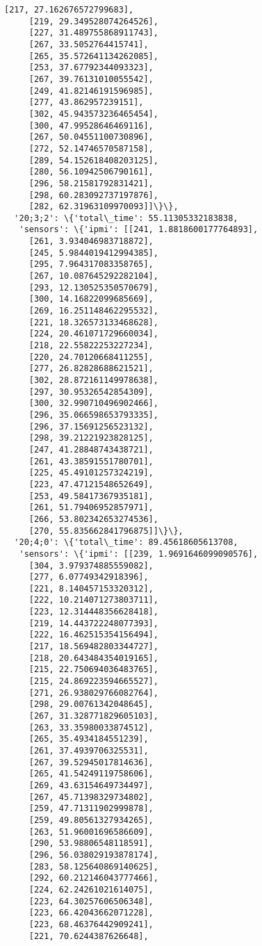 \documentclass[11pt]{article}
\begin{document}
\begin{tcolorbox}[breakable, size=fbox, boxrule=.5pt, pad at break*=1mm, opacityfill=0]
\begin{Verbatim}[commandchars=\\\{\}]
     [217, 27.162676572799683],
     [219, 29.349528074264526],
     [227, 31.489755868911743],
     [267, 33.5052764415741],
     [265, 35.572641134262085],
     [253, 37.67792344093323],
     [267, 39.76131010055542],
     [249, 41.82146191596985],
     [277, 43.862957239151],
     [302, 45.943573236465454],
     [300, 47.99528646469116],
     [267, 50.04551100730896],
     [272, 52.14746570587158],
     [289, 54.152618408203125],
     [280, 56.10942506790161],
     [296, 58.21581792831421],
     [298, 60.283092737197876],
     [282, 62.31963109970093]]\}\},
  '20;3;2': \{'total\_time': 55.11305332183838,
   'sensors': \{'ipmi': [[241, 1.8818600177764893],
     [261, 3.934046983718872],
     [245, 5.9844019412994385],
     [295, 7.964317083358765],
     [267, 10.087645292282104],
     [293, 12.130525350570679],
     [300, 14.16822099685669],
     [269, 16.251148462295532],
     [221, 18.326573133468628],
     [224, 20.461071729660034],
     [218, 22.55822253227234],
     [220, 24.70120668411255],
     [277, 26.82828688621521],
     [302, 28.872161149978638],
     [297, 30.95326542854309],
     [300, 32.990710496902466],
     [296, 35.066598653793335],
     [296, 37.15691256523132],
     [298, 39.21221923828125],
     [247, 41.28848743438721],
     [261, 43.38591551780701],
     [225, 45.49101257324219],
     [223, 47.47121548652649],
     [253, 49.58417367935181],
     [261, 51.79406952857971],
     [266, 53.802342653274536],
     [270, 55.835662841796875]]\}\},
  '20;4;0': \{'total\_time': 89.45618605613708,
   'sensors': \{'ipmi': [[239, 1.9691646099090576],
     [304, 3.979374885559082],
     [277, 6.07749342918396],
     [221, 8.140457153320312],
     [222, 10.214071273803711],
     [223, 12.314448356628418],
     [219, 14.443722248077393],
     [222, 16.462515354156494],
     [217, 18.569482803344727],
     [218, 20.643484354019165],
     [215, 22.750694036483765],
     [215, 24.869223594665527],
     [271, 26.938029766082764],
     [298, 29.00761342048645],
     [267, 31.328771829605103],
     [263, 33.35980033874512],
     [265, 35.4934184551239],
     [261, 37.4939706325531],
     [267, 39.52945017814636],
     [265, 41.54249119758606],
     [269, 43.63154649734497],
     [267, 45.71398329734802],
     [259, 47.71311902999878],
     [259, 49.80561327934265],
     [263, 51.96001696586609],
     [290, 53.98806548118591],
     [296, 56.038029193878174],
     [283, 58.125640869140625],
     [292, 60.212146043777466],
     [224, 62.24261021614075],
     [223, 64.30257606506348],
     [223, 66.42043662071228],
     [223, 68.46376442909241],
     [221, 70.6244387626648],

\end{Verbatim}
\end{tcolorbox}
\end{document}
